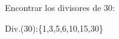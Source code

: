 
\question Encontrar los divisores de 30:

  \begin{solutionorlines}[1cm]
    Div.(30):\{1,3,5,6,10,15,30\}
  \end{solutionorlines}
